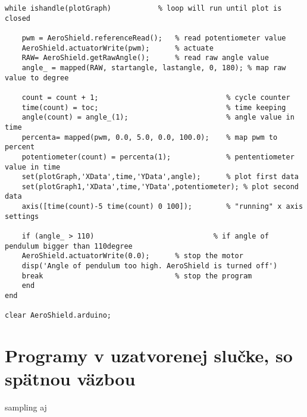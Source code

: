 \begin{lstlisting}[caption={AeroShield open loop, while cyklus.},captionpos=b]
while ishandle(plotGraph)           % loop will run until plot is closed
	
	pwm = AeroShield.referenceRead();   % read potentiometer value
	AeroShield.actuatorWrite(pwm);      % actuate 
	RAW= AeroShield.getRawAngle();      % read raw angle value
	angle_ = mapped(RAW, startangle, lastangle, 0, 180); % map raw value to degree 
	
	count = count + 1;                              % cycle counter
	time(count) = toc;                              % time keeping
	angle(count) = angle_(1);                       % angle value in time
	percenta= mapped(pwm, 0.0, 5.0, 0.0, 100.0);    % map pwm to percent 
	potentiometer(count) = percenta(1);             % pententiometer value in time
	set(plotGraph,'XData',time,'YData',angle);      % plot first data 
	set(plotGraph1,'XData',time,'YData',potentiometer); % plot second data 
	axis([time(count)-5 time(count) 0 100]);        % "running" x axis settings
	
	if (angle_ > 110)                            % if angle of pendulum bigger than 110degree
	AeroShield.actuatorWrite(0.0);      % stop the motor 
	disp('Angle of pendulum too high. AeroShield is turned off')
	break                               % stop the program
	end
end  

clear AeroShield.arduino;           
\end{lstlisting}

\section{Programy v uzatvorenej slučke, so spätnou väzbou}

sampling aj